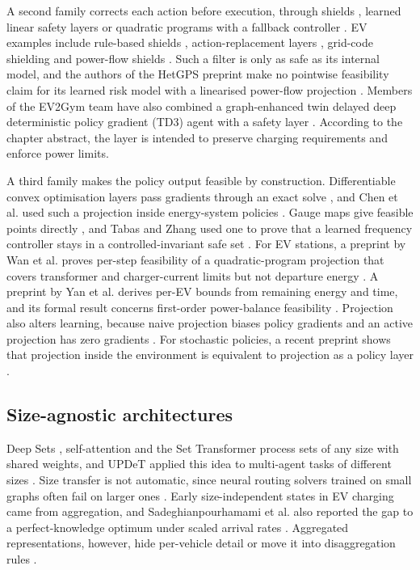 A second family corrects each action before execution, through shields \cite{alshiekh2018safe}, learned linear safety layers \cite{dalal2018safe} or quadratic programs with a fallback controller \cite{ceusters2023adaptive}.
EV examples include rule-based shields \cite{guan2024rule}, action-replacement layers \cite{zhang2025dumes}, grid-code shielding \cite{demirel2025multiobjective} and power-flow shields \cite{zaman2026graph}.
Such a filter is only as safe as its internal model, and the authors of the HetGPS preprint make no pointwise feasibility claim for its learned risk model with a linearised power-flow projection \cite{wang2026hetgps}.
Members of the EV2Gym team have also combined a graph-enhanced twin delayed deep deterministic policy gradient (TD3) agent \cite{fujimoto2018addressing} with a safety layer \cite{orfanoudakis2026can}.
According to the chapter abstract, the layer is intended to preserve charging requirements and enforce power limits.

A third family makes the policy output feasible by construction.
Differentiable convex optimisation layers pass gradients through an exact solve \cite{amos2017optnet,agrawal2019differentiable}, and Chen et al. used such a projection inside energy-system policies \cite{chen2021enforcing}.
Gauge maps give feasible points directly \cite{li2023learning}, and Tabas and Zhang used one to prove that a learned frequency controller stays in a controlled-invariant safe set \cite{tabas2022computationally}.
For EV stations, a preprint by Wan et al. proves per-step feasibility of a quadratic-program projection that covers transformer and charger-current limits but not departure energy \cite{wan2025logicinformed}.
A preprint by Yan et al. derives per-EV bounds from remaining energy and time, and its formal result concerns first-order power-balance feasibility \cite{yan2026hierarchical}.
Projection also alters learning, because naive projection biases policy gradients \cite{gros2020safe} and an active projection has zero gradients \cite{kasaura2023benchmarking}.
For stochastic policies, a recent preprint shows that projection inside the environment is equivalent to projection as a policy layer \cite{markgraf2025safe}.

\subsection{Size-agnostic architectures}\label{sec:rw-scale}

Deep Sets \cite{zaheer2017deep}, self-attention \cite{vaswani2017attention} and the Set Transformer \cite{lee2019set} process sets of any size with shared weights, and UPDeT applied this idea to multi-agent tasks of different sizes \cite{hu2021updet}.
Size transfer is not automatic, since neural routing solvers trained on small graphs often fail on larger ones \cite{joshi2022learning}.
Early size-independent states in EV charging came from aggregation, and Sadeghianpourhamami et al. also reported the gap to a perfect-knowledge optimum under scaled arrival rates \cite{sadeghianpourhamami2020definition}.
Aggregated representations, however, hide per-vehicle detail or move it into disaggregation rules \cite{zhang2022transfer,salesortiz2024efficient}.

